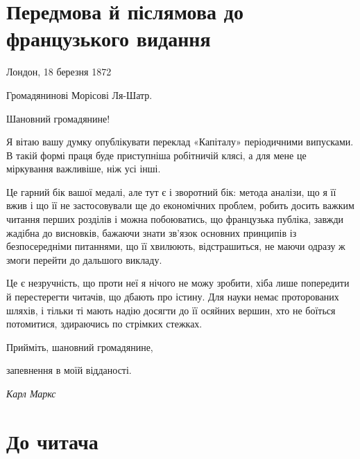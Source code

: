 \section*{Передмова й післямова до французького
видання}

\begin{flushright}
\small
Лондон, 18 березня 1872
\end{flushright}

\begin{center}
Громадянинові Морісові Ля-Шатр.
\end{center}

\hspace{\parindent}\hspace{\parindent}
Шановний громадянине!

Я вітаю вашу думку опублікувати переклад «Капіталу» періодичними
випусками. В такій формі праця буде приступніша
робітничій клясі, а для мене це міркування важливіше, ніж
усі інші.

Це гарний бік вашої медалі, але тут є і зворотний бік: метода
аналізи, що я її вжив і що її не застосовували ще до економічних
проблем, робить досить важким читання перших розділів і можна
побоюватись, що французька публіка, завжди жадібна до висновків,
бажаючи знати зв’язок основних принципів із безпосередніми
питаннями, що її хвилюють, відстрашиться, не маючи одразу ж
змоги перейти до дальшого викладу.

Це є незручність, що проти неї я нічого не можу зробити, хіба
лише попередити й перестерегти читачів, що дбають про істину.
Для науки немає проторованих шляхів, і тільки ті мають надію
досягти до її осяйних вершин, хто не боїться потомитися, здираючись
по стрімких стежках.

\hspace{\parindent}\hspace{\parindent}
Прийміть, шановний громадянине,

\hspace{\parindent}\hspace{\parindent}
\hspace{\parindent}\hspace{\parindent}\hspace{\parindent}
запевнення в моїй відданості.

\begin{flushright}
\emph{Карл Маркс}
\end{flushright}

\section*{До читача}


